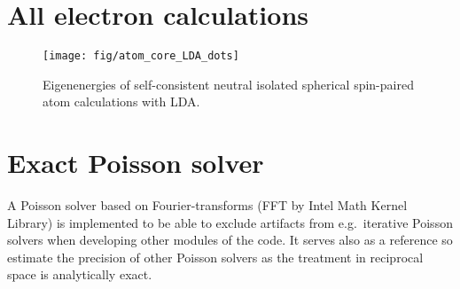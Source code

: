 \documentclass[oribibl]{llncs}
\newcommand{\ttt}[1]{\texttt{#1}}
\begin{document}
\section{All electron calculations}\label{sec:all-electron}
%
\begin{figure}
  \begin{minipage}[c]{.990\textwidth}
	\texttt{[image: fig/atom\_core\_LDA\_dots]} %
  \end{minipage}\hfill
  \begin{minipage}[c]{.009\textwidth}
  \end{minipage}
  \label{fig:atom_core_levels}
  \caption{
	Eigenenergies of self-consistent neutral isolated spherical spin-paired atom calculations with LDA.
  }
\end{figure}
%
%

\section{Exact Poisson solver}
%
%
%
A Poisson solver based on Fourier-transforms (FFT by Intel Math Kernel Library)
is implemented to be able to exclude artifacts from e.g.~iterative Poisson solvers
when developing other modules of the code. 
It serves also as a reference so estimate the precision of other Poisson solvers
as the treatment in reciprocal space is analytically exact.
\end{document}
